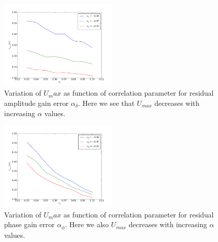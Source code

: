 \documentclass[fleqn,usenatbib]{mnras}
\begin{document}
\begin{figure}
    \centering
    \includegraphics[width=0.5\textwidth]{Umax_AlpDel.png}
    \caption{Variation of $U_max$ as function of correlation parameter for residual amplitude gain error $\alpha_{\delta}$. Here we see that $U_{max}$ decreases with increasing $\alpha$ values.}
    \label{fig:my_label}
\end{figure}
\begin{figure}
    \centering
    \includegraphics[width=0.5\textwidth]{Umax_AlpPhi.png}
    \caption{Variation of $U_max$ as function of correlation parameter for residual phase gain error $\alpha_{\phi}$. Here we also $U_{max}$ decreases with increasing $\alpha$ values.}  \label{fig:my_label}
\end{figure}
\end{document}
